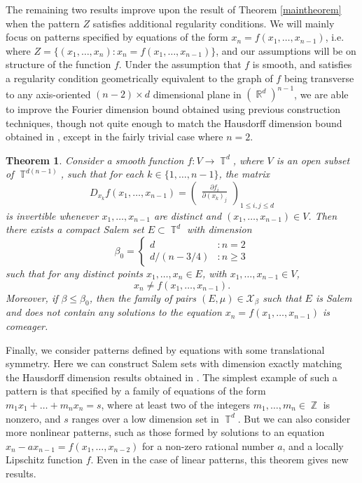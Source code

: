 \documentclass[dvipsnames,letterpaper,12pt]{article}
\numberwithin{equation}{section}
\DeclareMathOperator{\RR}{\mathbb{R}}
\DeclareMathOperator{\ZZ}{\mathbb{Z}}
\DeclareMathOperator{\TT}{\mathbb{T}}
\newtheorem{theorem}{Theorem}
\numberwithin{theorem}{section}
\begin{document}
The remaining two results improve upon the result of Theorem \ref{maintheorem} when the pattern $Z$ satisfies additional regularity conditions. We will mainly focus on patterns specified by equations of the form $x_n = f(x_1,\dots,x_{n-1})$, i.e. where $Z = \{ (x_1,\dots,x_n): x_n = f(x_1,\dots,x_{n-1}) \}$, and our assumptions will be on structure of the function $f$. Under the assumption that $f$ is smooth, and satisfies a regularity condition geometrically equivalent to the graph of $f$ being transverse to any axis-oriented $(n-2) \times d$ dimensional plane in $(\RR^d)^{n-1}$, we are able to improve the Fourier dimension bound obtained using previous construction techniques, though not quite enough to match the Hausdorff dimension bound obtained in \cite{PramanikFraser}, except in the fairly trivial case where $n = 2$.

\begin{theorem} \label{theoremJOICVIOJVI122}
    Consider a smooth function $f: V \to \TT^d$, where $V$ is an open subset of $\TT^{d(n-1)}$, such that for each $k \in \{ 1, \dots, n-1 \}$, the matrix
    \[ D_{x_k} f(x_1,\dots,x_{n-1}) = \begin{pmatrix} \frac{\partial f_i}{\partial (x_k)_j} \end{pmatrix}_{1 \leq i,j \leq d} \]
    is invertible whenever $x_1,\dots,x_{n-1}$ are distinct and $(x_1,\dots,x_{n-1}) \in V$. Then there exists a compact Salem set $E \subset \TT^d$ with dimension
    \[ \beta_0 = \begin{cases} d &: n = 2 \\ d/(n - 3/4) &: n \geq 3 \end{cases} \]
    such that for any distinct points $x_1, \dots, x_n \in E$, with $x_1,\dots,x_{n-1} \in V$,
    \[ x_n \neq f(x_1,\dots,x_{n-1}). \]
    Moreover, if $\beta \leq \beta_0$, then the family of pairs $(E,\mu) \in \mathcal{X}_\beta$ such that $E$ is Salem and does not contain any solutions to the equation $x_n = f(x_1,\dots,x_{n-1})$ is comeager.
\end{theorem}

Finally, we consider patterns defined by equations with some translational symmetry. Here we can construct Salem sets with dimension exactly matching the Hausdorff dimension results obtained in \cite{OurPaper}. The simplest example of such a pattern is that specified by a family of equations of the form $m_1x_1 + \dots + m_nx_n = s$, where at least two of the integers $m_1,\dots,m_n \in \ZZ$ is nonzero, and $s$ ranges over a low dimension set in $\TT^d$. But we can also consider more nonlinear patterns, such as those formed by solutions to an equation $x_n - a x_{n-1} = f(x_1,\dots,x_{n-2})$ for a non-zero rational number $a$, and a locally Lipschitz function $f$. Even in the case of linear patterns, this theorem gives new results.
\end{document}
